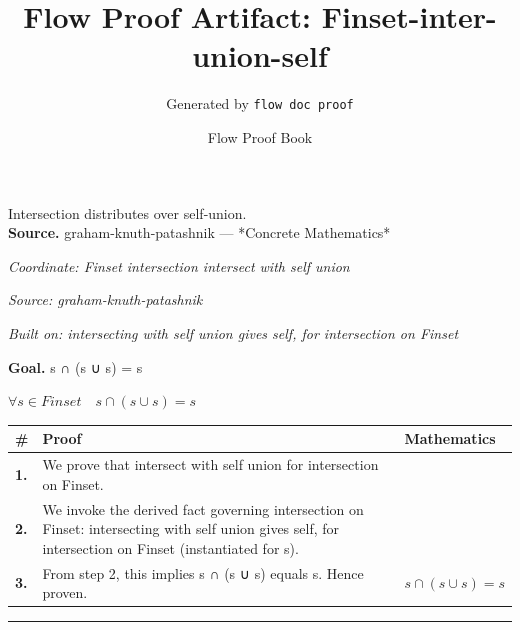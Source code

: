 \documentclass[11pt]{article}
\title{Flow Proof Artifact: Finset-inter-union-self}
\author{Generated by \texttt{flow doc proof}}
\date{Flow Proof Book}
\theoremstyle{definition}
\begin{document}
\maketitle
Intersection distributes over self-union.\\[0.5em]
\textbf{Source.} graham-knuth-patashnik — *Concrete Mathematics*\\[0.5em]
\bigskip
{}\par
\smallskip\noindent\textit{Coordinate: Finset \cdot intersection \cdot intersect with self union}\par
\smallskip\noindent\textit{Source: graham-knuth-patashnik}\par
\smallskip\noindent\textit{Built on: intersecting with self union gives self, for intersection on Finset}\par
\medskip
\noindent\textbf{Goal.} s ∩ (s ∪ s) = s\par
\noindent$\displaystyle \forall s \in Finset\quad s ∩ (s ∪ s) = s$\par
\medskip
\noindent
\begin{tabular}{@{} >{\raggedright\arraybackslash}p{} >{\raggedright\arraybackslash}p{} >{\raggedleft\arraybackslash}p{} @{}}
\textbf{\#} & \textbf{Proof} & \textbf{Mathematics} \\
\midrule
\textbf{1.} & We prove that intersect with self union for intersection on Finset. & \\[0.45em]
\textbf{2.} & We invoke the derived fact governing intersection on Finset: intersecting with self union gives self, for intersection on Finset (instantiated for s). & \\[0.45em]
\textbf{3.} & From step 2, this implies s ∩ (s ∪ s) equals s. Hence proven. & $\displaystyle s ∩ (s ∪ s) = s$ \\[0.45em]
\bottomrule
\end{tabular}
\label{thm:Finset-intersection-intersect_with_self_union}
\par\medskip\hrule
\end{document}
